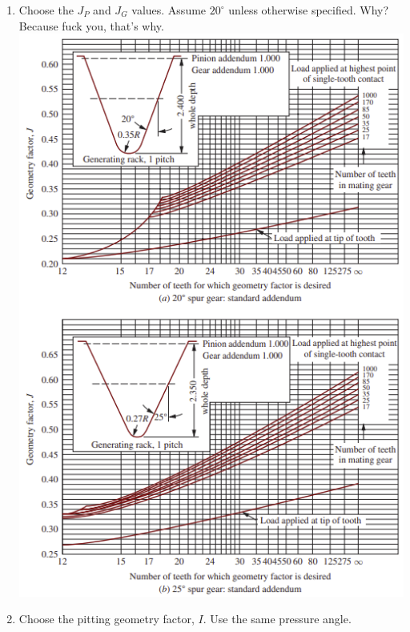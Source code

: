 \documentclass[11pt, fleqn]{article}
\begin{document}
\begin{enumerate}
    \item Choose the $J_P$ and $J_G$ values. Assume $20^\circ$ unless otherwise specified. Why? Because fuck you, that's why.\\
    \includegraphics[scale=1]{Gears/Fig 9-10.png}
    \item Choose the pitting geometry factor, $I$. Use the same pressure angle.\\

\end{enumerate}
\end{document}
